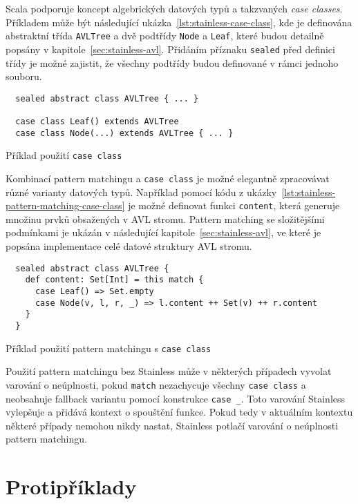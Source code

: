 Scala podporuje koncept algebrických datových typů
a takzvaných \textit{case classes}.
Příkladem může být následující ukázka~\ref{lst:stainless-case-class},
kde je definována abstraktní třída \texttt{AVLTree} a dvě podtřídy \texttt{Node} a \texttt{Leaf},
které budou detailně popsány v kapitole~\ref{sec:stainless-avl}.
Přidáním příznaku \texttt{sealed} před definici třídy
je možné zajistit, že všechny podtřídy budou definované v rámci jednoho souboru.

\begin{listing}[H]
  \begin{verbatim}
  sealed abstract class AVLTree { ... }

  case class Leaf() extends AVLTree
  case class Node(...) extends AVLTree { ... }
  \end{verbatim}
  \caption{Příklad použití \texttt{case class}}
  \label{lst:stainless-case-class}
\end{listing}

Kombinací pattern matchingu a \texttt{case class} je možné elegantně zpracovávat různé varianty datových typů.
Například pomocí kódu z ukázky~\ref{lst:stainless-pattern-matching-case-class}
je možné definovat funkci \texttt{content},
která generuje množinu prvků obsažených v AVL stromu.
Pattern matching se složitějšími podmínkami je ukázán v následující kapitole~\ref{sec:stainless-avl},
ve které je popsána implementace celé datové struktury AVL stromu.

\begin{listing}[H]
  \begin{verbatim}
  sealed abstract class AVLTree {
    def content: Set[Int] = this match {
      case Leaf() => Set.empty
      case Node(v, l, r, _) => l.content ++ Set(v) ++ r.content
    }
  }
  \end{verbatim}
  \caption{Příklad použití pattern matchingu s \texttt{case class}}
  \label{lst:stainless-pattern-matching-case-class}
\end{listing}

Použití pattern matchingu bez Stainless může v některých případech \mbox{vyvolat}
varování o neúplnosti, pokud \texttt{match} nezachycuje všechny \texttt{case class}
a neobsahuje fallback variantu pomocí konstrukce \texttt{case \_}.
Toto varování Stainless vylepšuje a přidává kontext o spouštění funkce.
Pokud tedy v aktuálním kontextu některé případy nemohou nikdy nastat,
Stainless potlačí varování o neúplnosti pattern matchingu.

\section{Protipříklady}
\label{sec:stainless-counterexamples}

